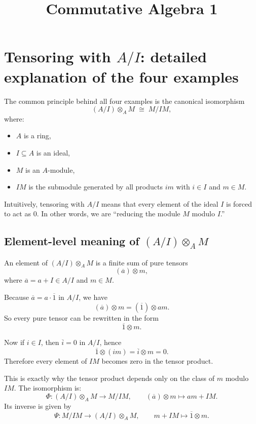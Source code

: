 \documentclass[12pt,a4paper]{article}
\title{Commutative Algebra 1}
\author{}
\date{}
\theoremstyle{plain}
\theoremstyle{definition}      %
\begin{document}
	\maketitle
	
	\section{Tensoring with \texorpdfstring{$A/I$}{A/I}: detailed explanation of the four examples}
	
	The common principle behind all four examples is the canonical isomorphism
	\[
	(A/I)\otimes_A M \;\cong\; M/IM,
	\]
	where:
	\begin{itemize}
		\item \(A\) is a ring,
		\item \(I\subseteq A\) is an ideal,
		\item \(M\) is an \(A\)-module,
		\item \(IM\) is the submodule generated by all products \(im\) with \(i\in I\) and \(m\in M\).
	\end{itemize}
	
	Intuitively, tensoring with \(A/I\) means that every element of the ideal \(I\) is forced to act as \(0\). In other words, we are ``reducing the module \(M\) modulo \(I\).''
	
	\subsection{Element-level meaning of \texorpdfstring{$(A/I)\otimes_A M$}{(A/I) tensor M}}
	
	An element of \((A/I)\otimes_A M\) is a finite sum of pure tensors
	\[
	(\overline{a})\otimes m,
	\]
	where \(\overline{a}=a+I\in A/I\) and \(m\in M\).
	
	Because \(\overline{a}=a\cdot \overline{1}\) in \(A/I\), we have
	\[
	(\overline{a})\otimes m
	=
	(\overline{1})\otimes am.
	\]
	So every pure tensor can be rewritten in the form
	\[
	\overline{1}\otimes m.
	\]
	
	Now if \(i\in I\), then \(\overline{i}=0\) in \(A/I\), hence
	\[
	\overline{1}\otimes (im)
	=
	\overline{i}\otimes m
	=
	0.
	\]
	Therefore every element of \(IM\) becomes zero in the tensor product.
	
	This is exactly why the tensor product depends only on the class of \(m\) modulo \(IM\). The isomorphism is:
	\[
	\Phi:(A/I)\otimes_A M \longrightarrow M/IM,
	\qquad
	(\overline{a})\otimes m \longmapsto am+IM.
	\]
	Its inverse is given by
	\[
	\Psi:M/IM \longrightarrow (A/I)\otimes_A M,
	\qquad
	m+IM \longmapsto \overline{1}\otimes m.
	\]
	
\end{document}
